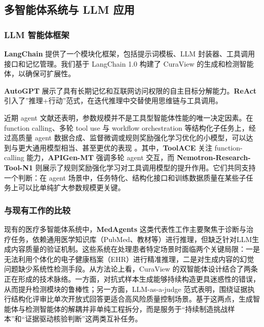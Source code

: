 \documentclass[11pt]{article}
\begin{document}
\subsection{多智能体系统与 LLM 应用}

\subsubsection{LLM 智能体框架}

\textbf{LangChain} \citep{chase2023langchain} 提供了一个模块化框架，包括提示词模板、LLM 封装器、工具调用接口和记忆管理。我们基于 LangChain 1.0 构建了 CuraView 的生成和检测智能体，以确保可扩展性。

\textbf{AutoGPT} \citep{significantgravitas2023autogpt} 展示了具有长期记忆和互联网访问权限的自主目标分解能力。\textbf{ReAct} \citep{yao2023react} 引入了''推理+行动''范式，在迭代推理中交替使用思维链与工具调用。

近期 agent 文献还表明，参数规模并不是工具型智能体性能的唯一决定因素。在 function calling、多轮 tool use 与 workflow orchestration 等结构化子任务上，经过高质量 agent 数据合成、监督微调或规则奖励强化学习优化的小模型，可以达到与更大通用模型相当、甚至更优的表现 \citep{liu2025toolACE,prabhakar2025apiGenMt,zhang2025nemotronToolN1}。其中，\textbf{ToolACE} \citep{liu2025toolACE} 关注 function-calling 能力，\textbf{APIGen-MT} \citep{prabhakar2025apiGenMt} 强调多轮 agent 交互，而 \textbf{Nemotron-Research-Tool-N1} \citep{zhang2025nemotronToolN1} 则展示了规则奖励强化学习对工具调用模型的提升作用。它们共同支持一个判断：在 agent 场景中，任务特化、结构化接口和训练数据质量在某些子任务上可以比单纯扩大参数规模更关键。

\subsubsection{与现有工作的比较}

现有的医疗多智能体系统中，\textbf{MedAgents} \citep{tang2023medAgents} 这类代表性工作主要聚焦于诊断与治疗任务，依赖通用医学知识库（PubMed、教材等）进行推理，但缺乏针对LLM生成内容质量的验证机制。这些系统在处理患者特定场景时面临两个关键局限：一是无法利用个体化的电子健康档案（EHR）进行精准推理，二是对生成内容的幻觉问题缺少系统性检测手段。从方法论上看，CuraView 的双智能体设计结合了两条正在形成的技术脉络。一方面，对抗式样本生成能够持续构造更具迷惑性的错误，从而提升检测模块的鲁棒性；另一方面，LLM-as-a-judge 范式表明，围绕证据执行结构化评审比单次开放式回答更适合高风险质量控制场景。基于这两点，生成智能体与检测智能体的解耦并非单纯工程拆分，而是服务于``持续制造挑战样本''和``证据驱动核验判断''这两类互补任务。
\end{document}
